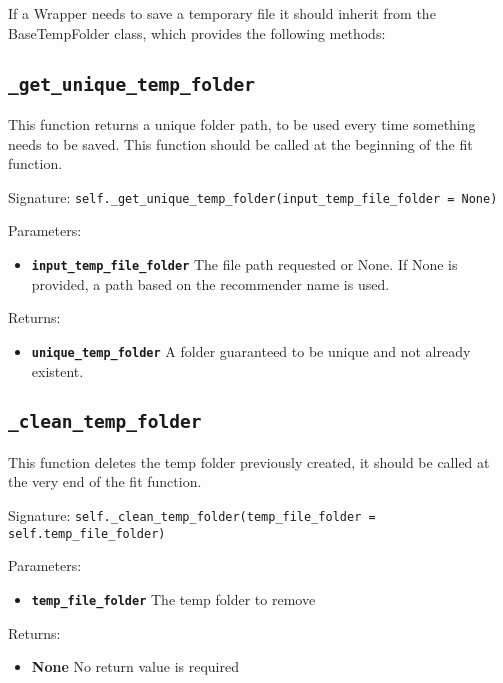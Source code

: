 If a Wrapper needs to save a temporary file it should inherit from the BaseTempFolder class, which provides the following methods:


\subsection{\texttt{\_get\_unique\_temp\_folder}}
This function returns a unique folder path, to be used every time something needs to be saved. This function should be called at the beginning of the fit function.

Signature: \texttt{self.\_get\_unique\_temp\_folder(input\_temp\_file\_folder = None)}

Parameters:
\begin{itemize}
    \item \textbf{\texttt{input\_temp\_file\_folder}} The file path requested or None. If None is provided, a path based on the recommender name is used.
\end{itemize}

Returns:
\begin{itemize}
    \item \textbf{\texttt{unique\_temp\_folder}} A folder guaranteed to be unique and not already existent.
\end{itemize}


\subsection{\texttt{\_clean\_temp\_folder}}
This function deletes the temp folder previously created, it should be called at the very end of the fit function.

Signature: \texttt{self.\_clean\_temp\_folder(temp\_file\_folder = self.temp\_file\_folder)}

Parameters:
\begin{itemize}
    \item \textbf{\texttt{temp\_file\_folder}} The temp folder to remove
\end{itemize}

Returns:
\begin{itemize}
    \item \textbf{None} No return value is required
\end{itemize}





